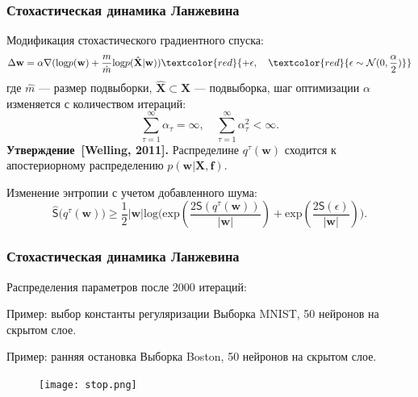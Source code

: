 \documentclass[10pt,pdf,utf8,russian,aspectratio=169]{beamer}
\begin{document}
\begin{frame}
\frametitle{Стохастическая динамика Ланжевина}
Модификация стохастического градиентного спуска:
\[
	\Delta \mathbf{w} = \alpha \nabla (\text{log}p(\mathbf{w})+\frac{m}{\hat{m}}\text{log}p(\hat{\mathbf{X}}|\mathbf{w}))  \textcolor{red}{+ \epsilon, \quad   \textcolor{red}{\epsilon \sim  \mathcal{N}({0},{\frac{\alpha}{2}})}}
\]
где $\hat{m}$ --- размер подвыборки,  $\hat{\mathbf{X}} \subset \mathbf{X}$ --- подвыборка, шаг оптимизации $\alpha$ изменяется с количеством итераций:
\[
	\sum_{\tau=1}^\infty \alpha_\tau = \infty, \quad \sum_{\tau=1}^\infty \alpha_\tau^2 < \infty.
\]
\textbf{Утверждение~[Welling, 2011].} Распределине $q^\tau(\mathbf{w})$ сходится к апостериорному распределению $p(\mathbf{w} | \mathbf{X},\mathbf{f})$.


Изменение энтропии с учетом добавленного шума:
\[
\hat{\mathsf{S}}\bigl(q^\tau(\mathbf{w})\bigr)   \geq \frac{1}{2}|\mathbf{w}|\text{log}\bigl(\text{exp}(\frac{2\mathsf{S}(q^\tau(\mathbf{w}))}{|\mathbf{w}|}) + \text{exp}(\frac{2\mathsf{S}( \epsilon)}{|\mathbf{w}|})\bigr).
\]

\end{frame}


\begin{frame}
\frametitle{Стохастическая динамика Ланжевина}
Распределения параметров после 2000 итераций:
\begin{figure}[h]
\centering
{}
\end{figure}

\end{frame}

\begin{frame}{Пример: выбор константы регуляризации}
Выборка MNIST, 50 нейронов на скрытом слое.

\begin{figure}
  \centering
\label{fig:1}\qquad
\end{figure}

\end{frame}
\begin{frame}{Пример: ранняя остановка}
Выборка Boston, 50 нейронов на скрытом слое.


\begin{figure}
  \centering
\texttt{[image: stop.png]}
\end{figure}


\end{frame}
\end{document}
